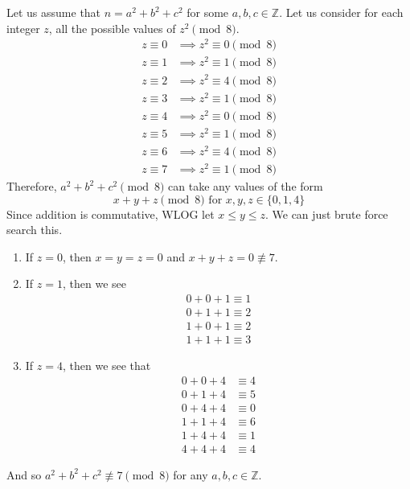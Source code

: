   \begin{exercise}[Shifrin 1.3.15]
    Let us assume that $n = a^2 + b^2 + c^2$ for some $a, b, c \in \mathbb{Z}$. Let us consider for each integer $z$, all the possible values of $z^2 \pmod{8}$. 
    \begin{align}
      z \equiv 0 & \implies z^2 \equiv 0 \pmod{8} \\
      z \equiv 1 & \implies z^2 \equiv 1 \pmod{8} \\
      z \equiv 2 & \implies z^2 \equiv 4 \pmod{8} \\
      z \equiv 3 & \implies z^2 \equiv 1 \pmod{8} \\
      z \equiv 4 & \implies z^2 \equiv 0 \pmod{8} \\
      z \equiv 5 & \implies z^2 \equiv 1 \pmod{8} \\
      z \equiv 6 & \implies z^2 \equiv 4 \pmod{8} \\
      z \equiv 7 & \implies z^2 \equiv 1 \pmod{8} 
    \end{align}
    Therefore, $a^2 + b^2 + c^2 \pmod{8}$ can take any values of the form 
    \begin{equation}
      x + y + z \pmod{8} \text{ for } x, y, z \in \{0, 1, 4\}
    \end{equation}
    Since addition is commutative, WLOG let $x \leq y \leq z$. We can just brute force search this. 
    \begin{enumerate}
      \item If $z = 0$, then $x = y = z = 0$ and $x + y + z = 0 \not\equiv 7$. 
      \item If $z = 1$, then we see 
      \begin{align}
        0 + 0 + 1 \equiv 1 \\ 
        0 + 1 + 1 \equiv 2 \\ 
        1 + 0 + 1 \equiv 2 \\ 
        1 + 1 + 1 \equiv 3 
      \end{align}
      \item If $z = 4$, then we see that 
        \begin{align}
          0 + 0 + 4 & \equiv 4 \\
          0 + 1 + 4 & \equiv 5 \\
          0 + 4 + 4 & \equiv 0 \\
          1 + 1 + 4 & \equiv 6 \\
          1 + 4 + 4 & \equiv 1 \\
          4 + 4 + 4 & \equiv 4
        \end{align}
    \end{enumerate}
    And so $a^2 + b^2 + c^2 \not\equiv 7 \pmod{8}$ for any $a, b, c \in \mathbb{Z}$. 
  \end{exercise}

